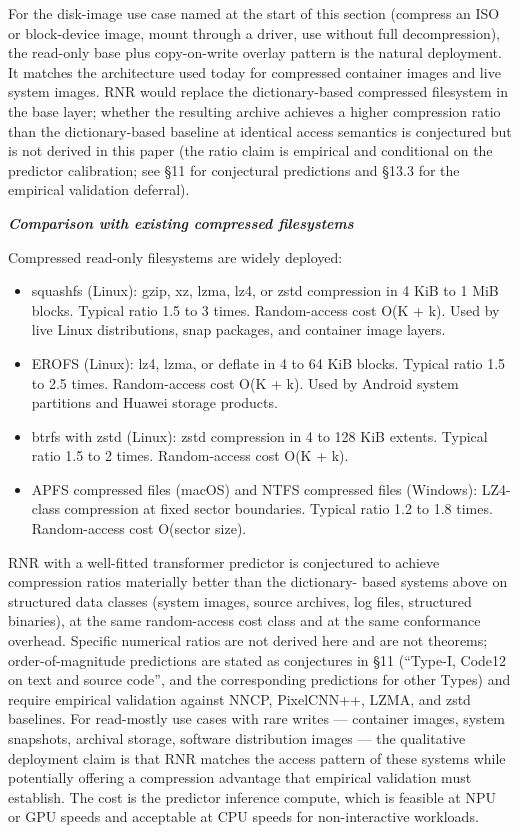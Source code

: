 \documentclass[
]{article}
\begin{document}
For the disk-image use case named at the start of this section (compress
an ISO or block-device image, mount through a driver, use without full
decompression), the read-only base plus copy-on-write overlay pattern is
the natural deployment. It matches the architecture used today for
compressed container images and live system images. RNR would
replace the dictionary-based compressed filesystem in the base
layer; whether the resulting archive achieves a higher compression
ratio than the dictionary-based baseline at identical access
semantics is conjectured but is not derived in this paper (the
ratio claim is empirical and conditional on the predictor
calibration; see §11 for conjectural predictions and §13.3 for the
empirical validation deferral).

\emph{\textbf{Comparison with existing compressed filesystems}}

Compressed read-only filesystems are widely deployed:

\begin{itemize}
\item
  squashfs (Linux): gzip, xz, lzma, lz4, or zstd compression in 4 KiB to
  1 MiB blocks. Typical ratio 1.5 to 3 times. Random-access cost O(K +
  k). Used by live Linux distributions, snap packages, and container
  image layers.
\item
  EROFS (Linux): lz4, lzma, or deflate in 4 to 64 KiB blocks. Typical
  ratio 1.5 to 2.5 times. Random-access cost O(K + k). Used by Android
  system partitions and Huawei storage products.
\item
  btrfs with zstd (Linux): zstd compression in 4 to 128 KiB extents.
  Typical ratio 1.5 to 2 times. Random-access cost O(K + k).
\item
  APFS compressed files (macOS) and NTFS compressed files (Windows):
  LZ4-class compression at fixed sector boundaries. Typical ratio 1.2 to
  1.8 times. Random-access cost O(sector size).
\end{itemize}

RNR with a well-fitted transformer predictor is conjectured to
achieve compression ratios materially better than the dictionary-
based systems above on structured data classes (system images,
source archives, log files, structured binaries), at the same
random-access cost class and at the same conformance overhead.
Specific numerical ratios are not derived here and are not theorems;
order-of-magnitude predictions are stated as conjectures in §11
(``Type-I, Code12 on text and source code'', and the corresponding
predictions for other Types) and require empirical validation
against NNCP, PixelCNN++, LZMA, and zstd baselines. For
read-mostly use cases with rare writes --- container images, system
snapshots, archival storage, software distribution images --- the
qualitative deployment claim is that RNR matches the access pattern
of these systems while potentially offering a compression advantage
that empirical validation must establish. The cost is the predictor
inference compute, which is feasible at NPU or GPU speeds and acceptable
at CPU speeds for non-interactive workloads.
\end{document}
